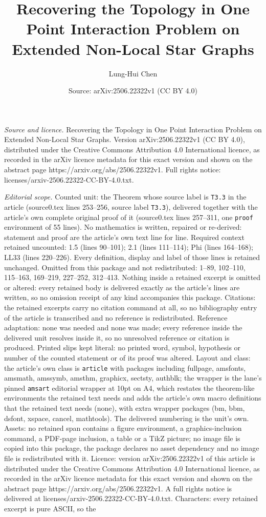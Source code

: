 \documentclass[10pt,a4paper]{amsart}
\title[Recovering the Topology in One Point Interaction Problem on ]{Recovering the Topology in One Point Interaction Problem on Extended Non-Local Star Graphs}
\author{Lung-Hui Chen}
\date{Source: arXiv:2506.22322v1 (CC BY 4.0)}
\begin{document}
\maketitle

\noindent\emph{Source and licence.} Recovering the Topology in One Point Interaction Problem on Extended Non-Local Star Graphs. Version arXiv:2506.22322v1 (CC BY 4.0), distributed under the Creative Commons Attribution 4.0 International licence, as recorded in the arXiv licence metadata for this exact version and shown on the abstract page https://arxiv.org/abs/2506.22322v1. Full rights notice: licenses/arxiv-2506.22322-CC-BY-4.0.txt.\par\smallskip

\noindent\textit{Editorial scope.} Counted unit: the Theorem whose source label is \texttt{T3.3} in the article (source0.tex lines 253--256, source label \texttt{T3.3}), delivered together with the article's own complete original proof of it (source0.tex lines 257--311, one \texttt{proof} environment of 55 lines). No mathematics is written, repaired or re-derived: statement and proof are the article's own text line for line. Required context retained uncounted: 1.5 (lines 90--101); 2.1 (lines 111--114); Phi (lines 164--168); LL33 (lines 220--226). Every definition, display and label of those lines is retained unchanged. Omitted from this package and not redistributed: 1--89, 102--110, 115--163, 169--219, 227--252, 312--413. Nothing inside a retained excerpt is omitted or altered: every retained body is delivered exactly as the article's lines are written, so no omission receipt of any kind accompanies this package. Citations: the retained excerpts carry no citation command at all, so no bibliography entry of the article is transcribed and no reference is redistributed. Reference adaptation: none was needed and none was made; every reference inside the delivered unit resolves inside it, so no unresolved reference or citation is produced. Printed slips kept literal: no printed word, symbol, hypothesis or number of the counted statement or of its proof was altered. Layout and class: the article's own class is \texttt{article} with packages including fullpage, amsfonts, amsmath, amssymb, amsthm, graphicx, sectsty, authblk; the wrapper is the lane's pinned \texttt{amsart} editorial wrapper at 10pt on A4, which restates the theorem-like environments the retained text needs and adds the article's own macro definitions that the retained text needs (none), with extra wrapper packages (bm, bbm, dsfont, xspace, cancel, mathtools). The delivered numbering is the unit's own. Assets: no retained span contains a figure environment, a graphics-inclusion command, a PDF-page inclusion, a table or a TikZ picture; no image file is copied into this package, the package declares no asset dependency and no image file is redistributed with it. Licence: version arXiv:2506.22322v1 of this article is distributed under the Creative Commons Attribution 4.0 International licence, as recorded in the arXiv licence metadata for this exact version and shown on the abstract page https://arxiv.org/abs/2506.22322v1. A full rights notice is delivered at licenses/arxiv-2506.22322-CC-BY-4.0.txt. Characters: every retained excerpt is pure ASCII, so the 
\end{document}
